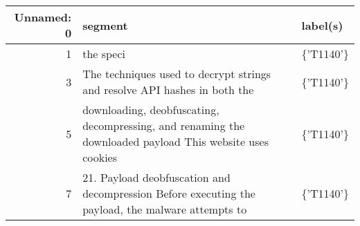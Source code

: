 \begin{tabular}{rll}
\toprule
Unnamed: 0 & segment & label(s) \\
\midrule
1 & the speci & \{'T1140'\} \\
3 & The techniques used to decrypt strings and resolve API hashes in both the & \{'T1140'\} \\
5 & downloading, deobfuscating, decompressing, and renaming the downloaded payload   This website uses cookies & \{'T1140'\} \\
7 & 21. Payload deobfuscation and decompression Before executing the payload, the malware attempts to & \{'T1140'\} \\
\bottomrule
\end{tabular}
